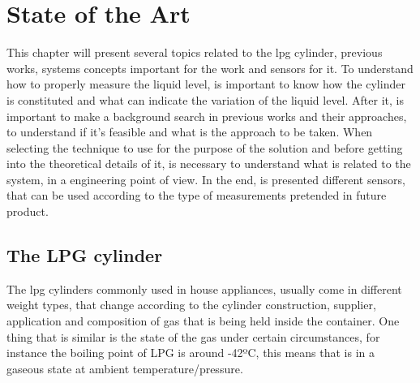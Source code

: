 \cleardoublepage
\chapter{State of the Art}\label{chap:stArt}


This chapter will present several topics related to the \acrshort{lpg} cylinder, previous works, systems concepts important for the work and sensors for it. To understand how to properly measure the liquid level, is important to know how the cylinder is constituted and what can indicate the variation of the liquid level. After it, is important to make a background search in previous works and their approaches, to understand if it's feasible and what is the approach to be taken. When selecting the technique to use for the purpose of the solution and before getting into the theoretical details of it, is necessary to understand what is related to the system, in a engineering point of view. In the end, is presented different sensors, that can be used according to the type of measurements pretended in future product.     
\section{The LPG cylinder}
The \acrshort{lpg} cylinders commonly used in house appliances, usually come in different weight types, that change according to the cylinder construction, supplier, application and composition of gas that is being held inside the container. One thing that is similar is the state of the gas under certain circumstances, for instance the boiling point of LPG is around -42ºC, this means that is in a gaseous state at ambient temperature/pressure.


